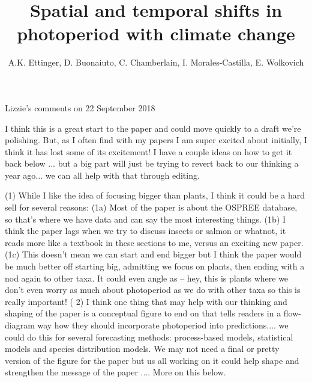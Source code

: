 \documentclass{article}
\begin{document}
 
\title{Spatial and temporal shifts in photoperiod with climate change} %

\author{A.K. Ettinger, D. Buonaiuto, C. Chamberlain, I. Morales-Castilla, E. Wolkovich}
\maketitle  %

\iffalse
Lizzie's comments on 22 September 2018

I think this is a great start to the paper and could move quickly to a draft we're polishing. But, as I often find with my papers I am super excited about initially, I think it has lost some of its excitement! I have a couple ideas on how to get it back below ... but a big part will just be trying to revert back to our thinking a year ago... we can all help with that through editing. 

(1) While I like the idea of focusing bigger than plants, I think it could be a hard sell for several reasons:
	(1a) Most of the paper is about the OSPREE database, so that's where we have data and can say the most interesting things.
	(1b) I think the paper lags when we try to discuss insects or salmon or whatnot, it reads more like a textbook in these sections to me, versus an exciting new paper.
	(1c) This doesn't mean we can start and end bigger but I think the paper would be much better off starting big, admitting we focus on plants, then ending with a nod again to other taxa. It could even angle as -- hey, this is plants where we don't even worry as much about photoperiod as we do with other taxa so this is really important!
(
2) I think one thing that may help with our thinking and shaping of the paper is a conceptual figure to end on that tells readers in a flow-diagram way how they should incorporate photoperiod into predictions.... we could do this for several forecasting methods: process-based models, statistical models and species distribution models. We may not need a final or pretty version of the figure for the paper but us all working on it could help shape and strengthen the message of the paper .... More on this below.
\end{document}
